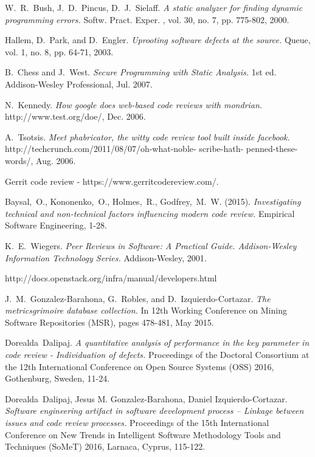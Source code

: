 \documentclass[10pt, conference]{IEEEtran}
\begin{document}
\begin{thebibliography}{1}
W.~R.~Bush, J.~D.~Pincus, D.~J.~Sielaff. \emph{A static
analyzer for finding dynamic programming errors.}
Softw. Pract. Exper. , vol. 30, no. 7, pp. 775-802,
2000.

Hallem, D.~Park, and D.~Engler. \emph{Uprooting software
defects at the source.} Queue, vol. 1, no. 8, pp. 64-71,
2003.

B.~Chess and J.~West. \emph{Secure Programming with
Static Analysis.} 1st ed. Addison-Wesley Professional,
Jul. 2007.

N.~Kennedy. \emph{How google does web-based code reviews
with mondrian.} http://www.test.org/doe/, Dec. 2006.

A.~Tsotsis. \emph{Meet phabricator, the witty code review
tool built inside facebook.}
http://techcrunch.com/2011/08/07/oh-what-noble-
scribe-hath- penned-these-words/, Aug.
2006.

Gerrit code review - https://www.gerritcodereview.com/.

Baysal,~O., Kononenko,~O., Holmes,~R., Godfrey,~M.~W. 
(2015). \emph{Investigating technical and non-technical 
factors influencing modern code review.} Empirical
Software Engineering, 1-28.

K.~E.~Wiegers. \emph{Peer Reviews in Software: A Practical 
Guide. Addison-Wesley Information Technology Series.} 
Addison-Wesley, 2001.

http://docs.openstack.org/infra/manual/developers.html

J.~M.~Gonzalez-Barahona, G.~Robles, and D.~Izquierdo-Cortazar. 
\emph{The metricsgrimoire database
collection.} In 12th Working Conference on Mining
Software Repositories (MSR), pages 478-481, May
2015.

Dorealda~Dalipaj. \emph{A quantitative analysis of
performance in the key parameter in code review -
Individuation of defects.} Proceedings of the Doctoral Consortium at the 12th 
International Conference on Open Source Systems (OSS) 2016, Gothenburg, Sweden, 
11-24.

Dorealda~Dalipaj, Jesus M. Gonzalez-Barahona, Daniel Izquierdo-Cortazar.
\emph{Software engineering artifact in software development process – 
Linkage between issues and code review processes.}
Proceedings of the 15th International Conference on New Trends 
in Intelligent Software Methodology Tools and Techniques (SoMeT) 2016, 
Larnaca, Cyprus, 115-122.


\end{thebibliography}
\end{document}
